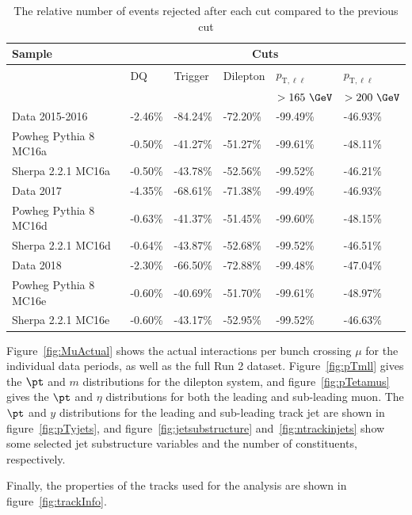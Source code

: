 \begin{table}[h!]
  \centering
  \begin{tabular}{l|l|l|l|l|l}
  \hline\hline
  \textbf{Sample} & \multicolumn{5}{c}{\textbf{Cuts}} \\ \hline
    & DQ & Trigger & Dilepton & $p_{\text{T},\ell\ell}$ & $p_{\text{T},\ell\ell}$ \\
    &  &  &  & $>165~\GeV$ & $>200~\GeV$ \\ \hline\hline
   Data 2015-2016 & -2.46\% & -84.24\% & -72.20\% & -99.49\% & -46.93\% \\ \hline
   Powheg Pythia 8 MC16a & -0.50\% & -41.27\% & -51.27\% & -99.61\% & -48.11\% \\ \hline
   Sherpa 2.2.1 MC16a & -0.50\% & -43.78\% & -52.56\% & -99.52\% & -46.21\% \\ \hline\hline
   Data 2017 & -4.35\% & -68.61\% & -71.38\% & -99.49\% & -46.93\% \\ \hline
   Powheg Pythia 8 MC16d & -0.63\% & -41.37\% & -51.45\% & -99.60\% & -48.15\% \\ \hline
   Sherpa 2.2.1 MC16d & -0.64\% & -43.87\% & -52.68\% & -99.52\% & -46.51\% \\ \hline\hline
   Data 2018 & -2.30\% & -66.50\% & -72.88\% & -99.48\% & -47.04\% \\ \hline
   Powheg Pythia 8 MC16e & -0.60\% & -40.69\% & -51.70\% & -99.61\% & -48.97\% \\ \hline
   Sherpa 2.2.1 MC16e & -0.60\% & -43.17\% & -52.95\% & -99.52\% & -46.63\% \\ \hline\hline
   \end{tabular}
   \caption{The relative number of events rejected after each cut compared to the previous cut}
   \label{tab:RelCF}
\end{table}

Figure~\ref{fig:MuActual} shows the actual interactions per bunch crossing $\mu$ for the individual data periods, as well as the full Run 2 dataset.
Figure~\ref{fig:pTmll} gives the $\pt$ and $m$ distributions for the dilepton system, and figure~\ref{fig:pTetamus} gives the $\pt$ and $\eta$ distributions for both the leading and sub-leading muon.
The $\pt$ and $y$ distributions for the leading and sub-leading track jet are shown in figure~\ref{fig:pTyjets}, and figure~\ref{fig:jetsubstructure} and~\ref{fig:ntrackinjets} show some
selected jet substructure variables and the number of constituents, respectively.

Finally, the properties of the tracks used for the analysis are shown in figure~\ref{fig:trackInfo}.

